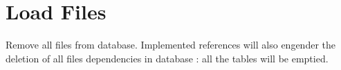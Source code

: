 \documentclass[letterpaper,10pt,english]{sphinxmanual}
\begin{document}
\section{Load Files}
\label{\detokenize{index:module-loacore.load.file_load}}\label{\detokenize{index:load-files}}

\begin{fulllineitems}
\label{\detokenize{index:loacore.load.file_load.clean_db}}
Remove all files from database. Implemented references will also engender the deletion of all files
dependencies in database : all the tables will be emptied.

\end{fulllineitems}

\end{document}
